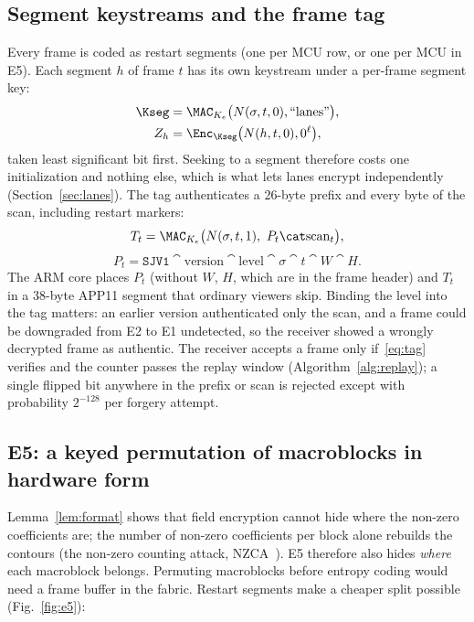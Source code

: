 \subsection{Segment keystreams and the frame tag}\label{sec:tag}
Every frame is coded as restart segments (one per MCU row, or one per MCU in E5). Each segment $h$ of frame $t$ has its own keystream under a per-frame segment key:
\begin{align}
\Kseg &= \MAC_{K_e}\bigl(N(\sigma, t, 0), \text{``lanes''}\bigr), \label{eq:kseg}\\
Z_h &= \Enc_{\Kseg}\bigl(N(h, t, 0), 0^{\ell}\bigr), \label{eq:zs}
\end{align}
taken least significant bit first. Seeking to a segment therefore costs one initialization and nothing else, which is what lets lanes encrypt independently (Section~\ref{sec:lanes}). The tag authenticates a 26-byte prefix and every byte of the scan, including restart markers:
\begin{equation}
T_t = \MAC_{K_e}\bigl(N(\sigma, t, 1),\ P_t \cat \text{scan}_t\bigr),
\label{eq:tag}
\end{equation}
\begin{equation*}
P_t = \texttt{SJV1} \cat \text{version} \cat \text{level} \cat \sigma \cat t \cat W \cat H.
\end{equation*}
The ARM core places $P_t$ (without $W$, $H$, which are in the frame header) and $T_t$ in a 38-byte APP11 segment that ordinary viewers skip. Binding the level into the tag matters: an earlier version authenticated only the scan, and a frame could be downgraded from E2 to E1 undetected, so the receiver showed a wrongly decrypted frame as authentic. The receiver accepts a frame only if~\eqref{eq:tag} verifies and the counter passes the replay window (Algorithm~\ref{alg:replay}); a single flipped bit anywhere in the prefix or scan is rejected except with probability $2^{-128}$ per forgery attempt.

\subsection{E5: a keyed permutation of macroblocks in hardware form}\label{sec:e5}
Lemma~\ref{lem:format} shows that field encryption cannot hide where the non-zero coefficients are; the number of non-zero coefficients per block alone rebuilds the contours (the non-zero counting attack, NZCA~\cite{hirose2024}). E5 therefore also hides \emph{where} each macroblock belongs. Permuting macroblocks before entropy coding would need a frame buffer in the fabric. Restart segments make a cheaper split possible (Fig.~\ref{fig:e5}):

